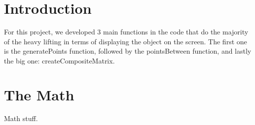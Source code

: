 \documentclass[14pt]{article}
\begin{document}
\newpage

\section*{Introduction}

For this project, we developed 3 main functions in the code that do the majority of the heavy lifting in terms of displaying the object on the screen. The first one is the generatePoints function, followed by the pointsBetween function, and lastly the big one: createCompositeMatrix.

\section*{The Math}

Math stuff.
\end{document}
